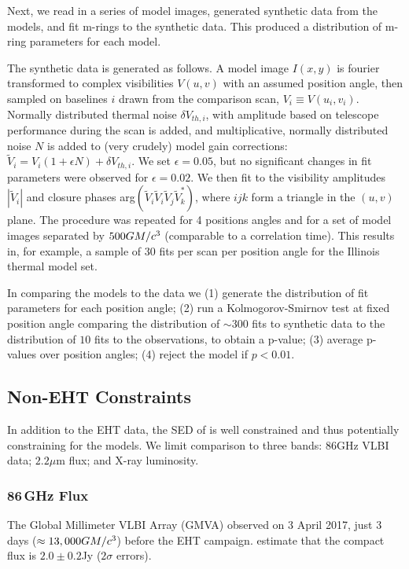 Next, we read in a series of model images, generated synthetic data from the models, and fit m-rings to the synthetic data.  This produced a distribution of m-ring parameters for each model.   

The synthetic data is generated as follows.  A model image $I(x,y)$ is fourier transformed to complex visibilities $V(u,v)$ with an assumed position angle, then sampled on baselines $i$ drawn from the comparison scan, $V_i \equiv V(u_i,v_i)$.  Normally distributed thermal noise $\delta V_{th,i}$, with amplitude based on telescope performance during the scan is added, and multiplicative, normally distributed noise $N$ is added to (very crudely) model gain corrections: $\tilde{V}_i = V_i (1 + \epsilon N) + \delta V_{th,i}$.  We set $\epsilon = 0.05$, but no significant changes in fit parameters were observed for $\epsilon = 0.02$.  We then fit to the visibility amplitudes $|\tilde{V}_i|$ and closure phases arg$(\tilde{V}_i \tilde{V}_i \tilde{V}_j \tilde{V}_k^*)$, where $ijk$ form a triangle in the $(u,v)$ plane.  The procedure was repeated for 4 positions angles and for a set of model images separated by $500 GM/c^3$ (comparable to a correlation time).  This results in, for example, a sample of $30$ fits per scan per position angle for the Illinois thermal model set.  

In comparing the models to the data we (1) generate the distribution of fit parameters for each position angle; (2) run a Kolmogorov-Smirnov test at fixed position angle comparing the distribution of $\sim 300$ fits to synthetic data to the distribution of $10$ fits to the observations, to obtain a p-value; (3) average p-values over position angles; (4) reject the model if $p < 0.01$.

\subsection{Non-EHT Constraints}

In addition to the EHT data, the SED of \sgra is well constrained \citep{PaperII} and thus potentially constraining for the models.  We limit comparison to three bands: 86GHz VLBI data; $2.2\mu$m flux; and X-ray luminosity.  

\subsubsection{86\,GHz Flux}

The Global Millimeter VLBI Array (GMVA) observed \sgra on 3 April 2017, just 3 days ($\approx 13,000 GM/c^3$) before the EHT campaign.  \cite{2019ApJ...871...30I} estimate that the compact flux is $2.0 \pm 0.2$Jy ($2\sigma$ errors).  

